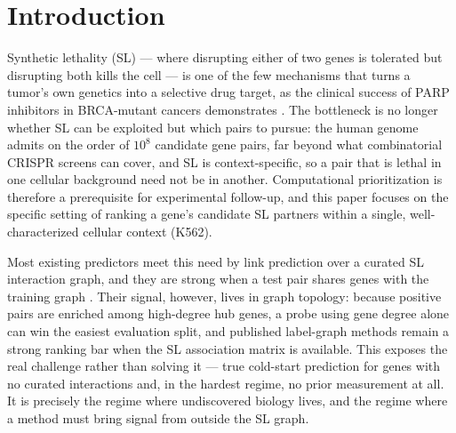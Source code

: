 \section{Introduction}
\label{sec:intro}




Synthetic lethality (SL) --- where disrupting either of two genes is tolerated
but disrupting both kills the cell --- is one of the few mechanisms that turns a
tumor's own genetics into a selective drug target, as the clinical success of
PARP inhibitors in BRCA-mutant cancers demonstrates \citep{oneil2017synthetic,
huang2019synthetic}. The bottleneck is no longer whether SL can be exploited but
which pairs to pursue: the human genome admits on the order of $10^8$ candidate
gene pairs, far beyond what combinatorial CRISPR screens can cover, and SL is
context-specific, so a pair that is lethal in one cellular background need not be
in another. Computational prioritization is therefore a prerequisite for
experimental follow-up, and this paper focuses on the specific setting of ranking
a gene's candidate SL partners within a single, well-characterized cellular
context (K562).

Most existing predictors meet this need by link prediction over a curated SL
interaction graph, and they are strong when a test pair shares genes with the
training graph \citep{feng2024benchmarking, wang2022slreview}. Their signal,
however, lives in graph topology: because positive pairs are enriched among
high-degree hub genes, a probe using gene degree alone can win the easiest
evaluation split, and published label-graph methods remain a strong ranking bar
when the SL association matrix is available. This exposes the real challenge
rather than solving it --- true cold-start prediction for genes with no curated
interactions and, in the hardest regime, no prior measurement at all. It is
precisely the regime where undiscovered biology lives, and the regime where a
method must bring signal from outside the SL graph.

